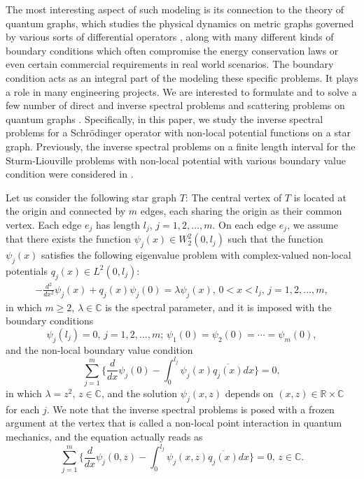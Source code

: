 \documentclass[10pt,a4paper]{article}
\theoremstyle{plain}
\theoremstyle{definition}
\theoremstyle{remark}
\numberwithin{equation}{section}
\begin{document}
\par
The most interesting aspect of such modeling is its connection to the theory of quantum graphs, which studies the physical dynamics on metric graphs governed by various sorts of differential operators \cite{Alb,Bon2,Bon,Bru,Freiling,Gerasimenko,Kottos,Naimark}, along with many different kinds of boundary conditions which often compromise the energy conservation laws or even certain commercial requirements in real world scenarios. The boundary condition acts as an integral part of the modeling these specific problems. It plays a role in many engineering projects. We are interested to formulate and to solve a few number of direct and inverse spectral problems and scattering problems on quantum graphs \cite{Belishev,Boman,Carlson,Kostrykin,Kurasov,Pivovarchik1,Pivovarchik2,Yurko1,Yurko2}.
Specifically, in this paper, we study the inverse spectral problems for a Schr\"{o}dinger operator with non-local potential functions on a star graph. Previously, the inverse spectral problems on a finite length interval for the Sturm-Liouville problems with non-local potential with various boundary value condition were considered in \cite{Alb,Alb2,Bon,Nizhnik1,Nizhnik2,Pivovarchik1,Yang,Shieh}.
\par
Let us consider the following star graph $T$: The central vertex of $T$ is located at the origin and connected by 
$m$ edges, each sharing the origin as their common vertex.  Each edge $e_{j}$ has length $l_{j}$, $j=1,2,\ldots,m$. %
    On each edge $e_{j}$, we assume that there exists the function $\psi_{j}(x)\in W_{2}^{2}(0,l_{j})$ such that the function $\psi_{j}(x)$ satisfies the following eigenvalue problem with complex-valued non-local potentials $q_{j}(x)\in L^{2}(0,l_{j})$:
\begin{eqnarray}\label{1.1}
-\frac{d^{2}}{dx^{2}}\psi_{j}(x)+q_{j}(x)\psi_{j}(0)=\lambda\psi_{j}(x),\,0<x<l_{j},\,j=1,2,\ldots,m,
\end{eqnarray}
in which $m\geq2$, $\lambda\in\mathbb{C}$ is the spectral parameter,
and it is imposed with the boundary conditions
\begin{equation}\label{1.2}
\psi_{j}(l_{j})=0,\,j=1,2,\ldots,m;\,\psi_{1}(0)=\psi_{2}(0)=\cdots=\psi_{m}(0),
\end{equation}
and the non-local boundary value condition
\begin{equation}\label{1.3}
\sum_{j=1}^{m}\big\{\frac{d}{dx}\psi_{j}(0)-\int_{0}^{l_{j}}\psi_{j}(x)\overline{q_{j}(x)}dx\big\}=0,
\end{equation}
in which $\lambda=z^{2}$, $z\in\mathbb{C}$, and the solution $\psi_{j}(x,z)$ depends on $(x,z)\in\mathbb{R}\times\mathbb{C}$ for each $j$.
We note that the inverse spectral problems is posed with a frozen argument at the vertex that is called a non-local point interaction in quantum mechanics, and  the equation actually reads as
\begin{equation}\label{1.6}
\sum_{j=1}^{m}\big\{\frac{d}{dx}\psi_{j}(0,z)-\int_{0}^{l_{j}}\psi_{j}(x,z)\overline{q_{j}(x)}dx\big\}=0,\,z\in\mathbb{C}.
\end{equation}
\end{document}
